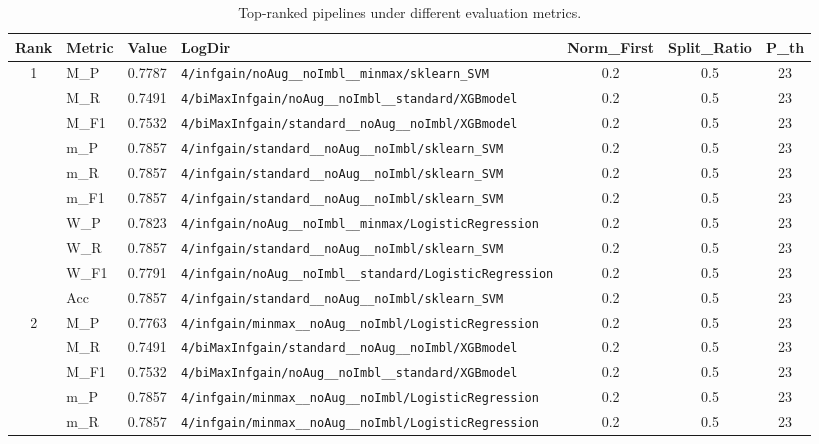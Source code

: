 \begin{table}[htbp]
\caption{Top-ranked pipelines under different evaluation metrics.}
\label{tab:rank_metric_vertical}
\centering
\small
\setlength{\tabcolsep}{4pt}
\begin{tabular}{|c|l|c|>{\ttfamily\footnotesize}p{7.2cm}|c|c|c|}
\hline
Rank & Metric & Value & LogDir & Norm\_First & Split\_Ratio & P\_th \\
\hline
\multirow{10}{*}{1} & M\_P & 0.7787 & \texttt{4/infgain/noAug\_\_noImbl\_\_minmax/sklearn\_SVM} & 0.2 & 0.5  & 23 \\ 
 & M\_R & 0.7491 & \texttt{4/biMaxInfgain/noAug\_\_noImbl\_\_standard/XGBmodel} & 0.2 & 0.5  & 23 \\ 
 & M\_F1 & 0.7532 & \texttt{4/biMaxInfgain/standard\_\_noAug\_\_noImbl/XGBmodel} & 0.2 & 0.5  & 23 \\ 
 & m\_P & 0.7857 & \texttt{4/infgain/standard\_\_noAug\_\_noImbl/sklearn\_SVM} & 0.2 & 0.5  & 23 \\ 
 & m\_R & 0.7857 & \texttt{4/infgain/standard\_\_noAug\_\_noImbl/sklearn\_SVM} & 0.2 & 0.5  & 23 \\ 
 & m\_F1 & 0.7857 & \texttt{4/infgain/standard\_\_noAug\_\_noImbl/sklearn\_SVM} & 0.2 & 0.5  & 23 \\ 
 & W\_P & 0.7823 & \texttt{4/infgain/noAug\_\_noImbl\_\_minmax/LogisticRegression} & 0.2 & 0.5  & 23 \\ 
 & W\_R & 0.7857 & \texttt{4/infgain/standard\_\_noAug\_\_noImbl/sklearn\_SVM} & 0.2 & 0.5  & 23 \\ 
 & W\_F1 & 0.7791 & \texttt{4/infgain/noAug\_\_noImbl\_\_standard/LogisticRegression} & 0.2 & 0.5  & 23 \\ 
 & Acc & 0.7857 & \texttt{4/infgain/standard\_\_noAug\_\_noImbl/sklearn\_SVM} & 0.2 & 0.5  & 23 \\ 
\hline
\multirow{10}{*}{2} & M\_P & 0.7763 & \texttt{4/infgain/minmax\_\_noAug\_\_noImbl/LogisticRegression} & 0.2 & 0.5  & 23 \\ 
 & M\_R & 0.7491 & \texttt{4/biMaxInfgain/standard\_\_noAug\_\_noImbl/XGBmodel} & 0.2 & 0.5  & 23 \\ 
 & M\_F1 & 0.7532 & \texttt{4/biMaxInfgain/noAug\_\_noImbl\_\_standard/XGBmodel} & 0.2 & 0.5  & 23 \\ 
 & m\_P & 0.7857 & \texttt{4/infgain/minmax\_\_noAug\_\_noImbl/LogisticRegression} & 0.2 & 0.5  & 23 \\ 
 & m\_R & 0.7857 & \texttt{4/infgain/minmax\_\_noAug\_\_noImbl/LogisticRegression} & 0.2 & 0.5  & 23 \\ 

\end{tabular}
\end{table}
